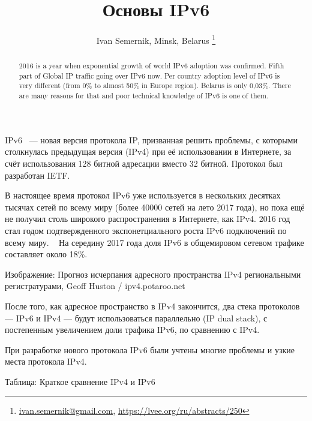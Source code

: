 \documentclass[10pt, a5paper]{article}
\begin{document}
\title{Основы IPv6}
\author{Ivan Semernik, Minsk, Belarus \footnote{\url{ivan.semernik@gmail.com}, \url {https://lvee.org/ru/abstracts/250}}}
\maketitle
\begin{abstract}
2016 is a year when exponential growth of world IPv6 adoption was confirmed. Fifth part of Global IP traffic going over IPv6 now. Per country adoption level of IPv6 is very different (from 0\% to almost 50\% in Europe region). Belarus is only 0,03\%. There are many reasons for that and poor technical knowledge of IPv6 is one of them.
\end{abstract}
IPv6 ~--- новая версия протокола IP, призванная решить проблемы, с которыми столкнулась предыдущая версия (IPv4) при её использовании в Интернете, за счёт использования 128 битной адресации вместо 32 битной. Протокол был разработан IETF. ~\cite{Semernik-0}

В настоящее время протокол IPv6 уже используется в нескольких десятках тысячах сетей по всему миру (более 40000 сетей на лето 2017 года), но пока ещё не получил столь широкого распространения в Интернете, как IPv4. 2016 год стал годом подтвержденного экспонетциального роста IPv6 подключений по всему миру. ~\cite{Semernik-1} На середину 2017 года доля IPv6 в общемировом сетевом трафике составляет около 18\%. ~\cite{Semernik-2}

Изображение: Прогноз исчерпания адресного пространства IPv4 региональными регистратурами, Geoff Huston / ipv4.potaroo.net



После того, как адресное пространство в IPv4 закончится, два стека протоколов — IPv6 и IPv4 — будут использоваться параллельно (IP dual stack), с постепенным увеличением доли трафика IPv6, по сравнению с IPv4.

При разработке нового протокола IPv6 были учтены многие проблемы и узкие места протокола IPv4.

Таблица: Краткое сравнение IPv4 и IPv6
\end{document}
